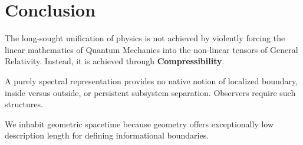 \section{Conclusion}

The long-sought unification of physics is not achieved by violently forcing the linear mathematics of Quantum Mechanics into the non-linear tensors of General Relativity.
Instead, it is achieved through \textbf{Compressibility}.

A purely spectral representation provides no native notion of localized boundary, inside versus outside, or persistent subsystem separation.
Observers require such structures.

We inhabit geometric spacetime because geometry offers exceptionally low description length for defining
informational boundaries.

